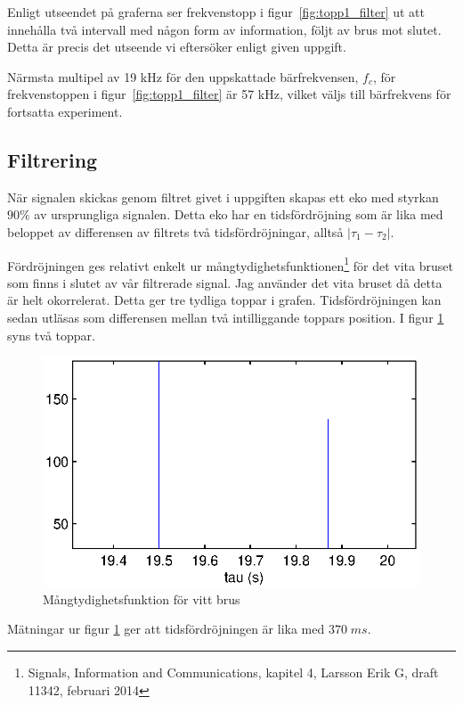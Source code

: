 \documentclass[10pt,twocolumn]{article}
\begin{document}
Enligt utseendet på graferna ser frekvenstopp i figur~\ref{fig:topp1_filter} ut att innehålla två intervall med någon form av information, följt av brus mot slutet. Detta är precis det utseende vi eftersöker enligt given uppgift. 

Närmsta multipel av 19 kHz för den uppskattade bärfrekvensen, $f_c$, för frekvenstoppen i figur~\ref{fig:topp1_filter} är 57 kHz, vilket väljs till bärfrekvens för fortsatta experiment. 

\subsection{Filtrering}

När signalen skickas genom filtret givet i uppgiften skapas ett eko med styrkan $90\%$ av ursprungliga signalen. Detta eko har en tidsfördröjning som är lika med beloppet av differensen av filtrets två tidsfördröjningar, alltså $|\tau_1 - \tau_2|$.

Fördröjningen ges relativt enkelt ur mångtydighetsfunktionen\footnote{Signals, Information and Communications, kapitel 4, Larsson Erik G, draft 11342, februari 2014} för det vita bruset som finns i slutet av vår filtrerade signal. Jag använder det vita bruset då detta är helt okorrelerat. Detta ger tre tydliga toppar i grafen. Tidsfördröjningen kan sedan utläsas som differensen mellan två intilliggande toppars position. I figur \ref{fig:xCorr} syns två toppar.  
\begin{figure}[htp]
  \begin{center}
  \includegraphics[keepaspectratio=true,width=\linewidth]{xCorr.eps}  %
  \end{center}
  \caption{Mångtydighetsfunktion för vitt brus} %
  \label{fig:xCorr}
\end{figure}
Mätningar ur figur \ref{fig:xCorr} ger att tidsfördröjningen är lika med $370\;ms$. 
\end{document}
